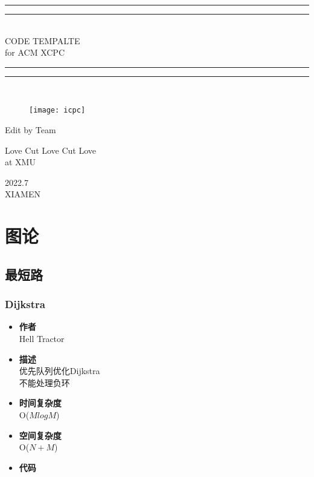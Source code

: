 \documentclass[a4paper,11pt,twoside,fontset = fandol,UTF8]{ctexbook}
\newcommand{\emptyPage}{\null\thispagestyle{empty}\addtocounter{page}{-1}\newpage}
\newcommand{\code}[5]{
  \begin{itemize}
    \setlength{\itemsep}{0pt}
    \item \textbf{作者} \\ #1
    \item \textbf{描述} \\ #2
    \item \textbf{时间复杂度} \\ O($ #3 $)
    \item \textbf{空间复杂度} \\ O($ #4 $)
    \item \textbf{代码}
    
  \end{itemize}
}
\begin{document}
  \begin{titlepage}       %
    \centering
    \vspace*{\baselineskip}
    \rule{\textwidth}{1.6pt}
    \vspace*{-\baselineskip}
    \vspace*{2pt}
    \rule{\textwidth}{0.4pt}\\[\baselineskip]{\LARGE CODE TEMPALTE\\[\baselineskip]\small for ACM XCPC}
    \\[0.2\baselineskip]
    \rule{\textwidth}{0.4pt}\vspace*{-\baselineskip}\vspace{3.2pt}
    \rule{\textwidth}{1.6pt}\\[\baselineskip]
    \scshape

    \begin{figure}[!htb]
        \centering
        \texttt{[image: icpc]}    %
    \end{figure}

    \vspace*{3\baselineskip}
    Edit by Team\\
    [\baselineskip]
    {\Large {}  \par}
    {\Large Love Cut Love Cut Love \\ \normalsize{at XMU}\par}
    \vfill
    {\scshape 2022.7}\\{\large XIAMEN}\par
  \end{titlepage}

  \emptyPage

  \setcounter{page}{1}
  \tableofcontents

  \newpage
  \setcounter{page}{1}

  \chapter{图论}
  \setcounter{page}{1}
  \section{最短路}
  \subsection{Dijkstra}
  \code{Hell Tractor}{优先队列优化Dijkstra \\ {\color{red}不能处理负环}}{MlogM}{N + M}{codes/dijkstra.cpp}
\end{document}
